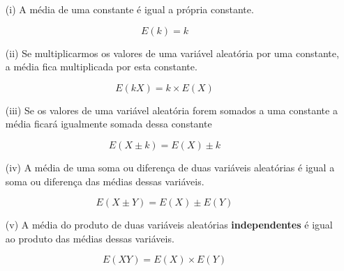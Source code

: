 \begin{enumerate}
    \item[{(i)}] A média de uma constante é igual a própria constante.
\end{enumerate}

\begin{equation}\label{}
E(k)=k
\end{equation}


\begin{enumerate}
    \item[{(ii)}] Se multiplicarmos os valores de uma variável aleatória
    por uma constante, a média fica multiplicada por esta
    constante.
\end{enumerate}


\begin{equation}\label{}
E(kX)=k \times E(X)
\end{equation}


\begin{enumerate}
    \item[{(iii)}] Se os valores de uma variável aleatória forem somados a
    uma constante a média ficará igualmente somada dessa constante
\end{enumerate}


\begin{equation}\label{}
E(X\pm k)=E(X)\pm k
\end{equation}


\begin{enumerate}
    \item[{(iv)}] A média de uma soma ou diferença de duas variáveis
    aleatórias é igual a soma ou diferença das médias dessas
    variáveis.
\end{enumerate}


\begin{equation}\label{}
E(X \pm Y)= E(X)\pm E(Y)
\end{equation}


\begin{enumerate}
    \item[{(v)}] A média do produto de duas variáveis
    aleatórias \textbf{independentes} é igual ao produto das
    médias dessas variáveis.
\end{enumerate}


\begin{equation}\label{}
E(XY)= E(X) \times E(Y)
\end{equation}





